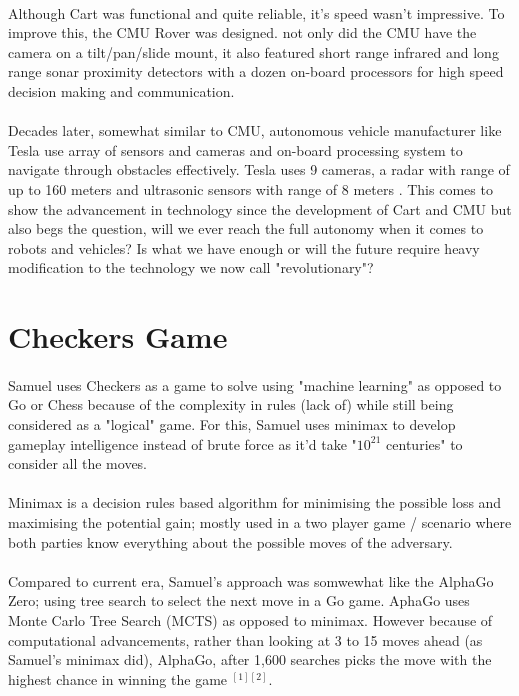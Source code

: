 \documentclass[10pt]{article}
\begin{document}
  \paragraph{}\indent
  Although Cart was functional and quite reliable, it's speed wasn't impressive. To improve this, the CMU Rover was designed. not only did the CMU have the camera on a tilt/pan/slide mount, it also featured short range infrared and long range sonar proximity detectors with a dozen on-board processors for high speed decision making and communication. 
  \paragraph{}\indent
  Decades later, somewhat similar to CMU, autonomous vehicle manufacturer like Tesla use array of sensors and cameras and on-board processing system to navigate through obstacles effectively. Tesla uses 9 cameras, a radar with range of up to 160 meters and ultrasonic sensors with range of 8 meters \cite{tesla}. This comes to show the advancement in technology since the development of Cart and CMU but also begs the question, will we ever reach the full autonomy when it comes to robots and vehicles? Is what we have enough or will the future require heavy modification to the technology we now call "revolutionary"? 
  

  \section{Checkers Game}
  \paragraph{} \indent
  Samuel uses Checkers as a game to solve using "machine learning" as opposed to Go or Chess because of the complexity in rules (lack of) while still being considered as a "logical" game. For this, Samuel uses minimax to develop gameplay intelligence instead of brute force as it'd take "$10^{21}$ centuries" to consider all the moves.   
  \paragraph{}\indent
  Minimax is a decision rules based algorithm for minimising the possible loss and maximising the potential gain; mostly used in a two player game / scenario where both parties know everything about the possible moves of the adversary.
  \paragraph{}\indent
  Compared to current era, Samuel's approach was somwewhat like the AlphaGo Zero; using tree search to select the next move in a Go game. AphaGo uses Monte Carlo Tree Search (MCTS) as opposed to minimax. However because of computational advancements, rather than looking at 3 to 15 moves ahead (as Samuel's minimax did), AlphaGo, after 1,600 searches picks the move with the highest chance in winning the game $^{[1][2]}$. 
\end{document}
